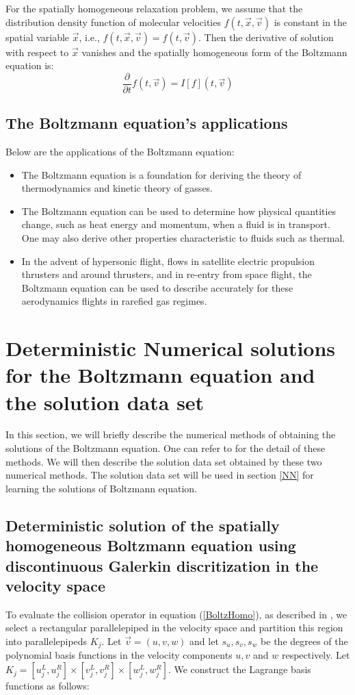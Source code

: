 \documentclass{article}
\begin{document}
For the spatially homogeneous relaxation problem, we assume that the distribution density function of molecular velocities $f(t, \vec{x}, \vec{v})$ is constant in the spatial variable $\vec{x}$, i.e., $f(t, \vec{x}, \vec{v}) = f(t, \vec{v})$. Then the derivative of solution with respect to $\vec{x}$ vanishes and the spatially homogeneous form of the Boltzmann equation is:
\begin{equation}	\label{BoltzHomo}
	\frac{\partial}{\partial t}f(t,\vec{v}) = I[f](t, \vec{v})
\end{equation}
\subsection{The Boltzmann equation's applications}
Below are the applications of the Boltzmann equation:
\begin{itemize}
	\item The Boltzmann equation is a foundation for deriving the theory of thermodynamics and kinetic theory of gasses.
	\item The Boltzmann equation can be used to determine how physical quantities change, such as heat energy and momentum, when a fluid is in transport. One may also derive other properties characteristic to fluids such as thermal.
	\item In the advent of hypersonic flight, flows in satellite electric propulsion thrusters and around thrusters, and in re-entry from space flight, the Boltzmann equation can be used to describe accurately for these aerodynamics flights in rarefied gas regimes.
\end{itemize}

\section{Deterministic Numerical solutions for the Boltzmann equation and the solution data set} \label{BoltzSol}
In this section, we will briefly describe the numerical methods of obtaining the solutions of the Boltzmann equation. One can refer to \cite{Alekseenko2, Alekseenko4} for the detail of these methods. We will then describe the solution data set obtained by these two numerical methods. The solution data set will be used in section \ref{NN} for learning the solutions of Boltzmann equation.
\subsection{Deterministic solution of the spatially homogeneous Boltzmann equation using discontinuous Galerkin discritization in the velocity space} 
To evaluate the collision operator in equation (\ref{BoltzHomo}), as described in \cite{Alekseenko2}, we select a rectangular parallelepiped in the velocity space  and partition this region into parallelepipeds $K_j$. Let $\vec{v} = (u,v,w)$ and let $s_u, s_v, s_w$ be the degrees of the polynomial basis functions in the velocity components $u, v$ and $w$ respectively. Let $K_j = [u^L_j, u^R_j]\times[v^L_j,v^R_j]\times[w^L_j,w^R_j]$. We construct the Lagrange basis functions as follows:
\end{document}
